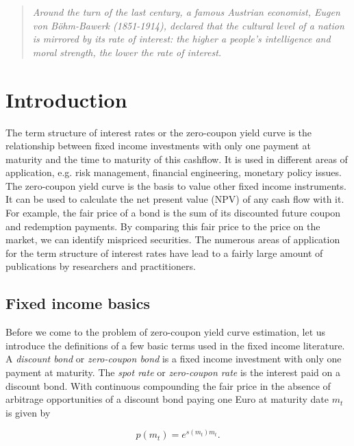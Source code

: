 \begin{quote}
\emph{
  Around the turn of the last century, a famous Austrian economist, Eugen von B\"{o}hm-Bawerk (1851-1914), declared that the cultural level of a nation is  mirrored by its rate of interest: the higher a people's intelligence and moral strength, the lower the rate of interest.}
\\
\end{quote}

\section{Introduction}

The term structure of interest rates or the zero-coupon yield curve is the relationship between fixed income investments with only one payment at maturity and the time to maturity of this cashflow. It is used in different areas of application, e.g. risk management, financial engineering, monetary policy issues. The zero-coupon yield curve is the basis to value other fixed income instruments. It can be used to calculate the net present value (NPV) of any cash flow with it. For example, the fair price of a bond is the sum of its discounted future coupon and redemption payments. By comparing this fair price to the price on the market, we can identify mispriced securities. The numerous areas of application for the term structure of interest rates have lead to a fairly large amount of publications by researchers and practitioners.

\subsection{Fixed income basics}

Before we come to the problem of zero-coupon yield curve estimation, let us introduce the definitions of a few basic terms used in the fixed income literature. A \emph{discount bond} or \emph{zero-coupon bond} is a fixed income investment with only one payment at maturity. The \emph{spot rate} or \emph{zero-coupon rate} is the interest paid on a discount bond. With continuous compounding the fair price in the absence of arbitrage opportunities of a discount bond paying one Euro at maturity date  $m_t$ is given by

\begin{equation}
  \label{eq:pricediscountbond}
  p(m_t)=e^{s(m_t)m_t}.
\end{equation}

